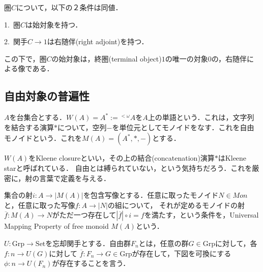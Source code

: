 \documentclass[uplatex, dvipdfmx]{jsreport}
\begin{document}
\begin{proposition}[始対象を持つ圏の特徴付け]\rm{}
    圏$C$について，以下の２条件は同値．
    
    1.\, 圏$C$は始対象を持つ．

    2.\, 関手$C\to 1$は右随伴(right adjoint)を持つ．
\end{proposition}
この下で，圏$C$の始対象は，終圏(terminal object)$1$の唯一の対象$0$の，右随伴による像である．

\subsection{自由対象の普遍性}

\begin{definition}[自由モノイド]\label{def-free_monoid}
    $A$を台集合とする．$W(A)=A^*:={}^{<\omega}\!A$を$A$上の単語という．これは，文字列を結合する演算$*$について，空列$-$を単位元としてモノイドをなす．これを自由モノイドという．これを$M(A)=(A^*,*,-)$とする．
\end{definition}
$W(A)$をKleene closureといい，その上の結合(concatenation)演算$*$はKleene starと呼ばれている．
自由とは縛られていない，という気持ちだろう．これを厳密に，射の言葉で定義を与える．

\begin{definition}\rm{}
    集合の射$i:A\to |M(A)|$を包含写像とする．任意に取ったモノイド$N\in Mon$と，任意に取った写像$f:A\to |N|$の組について，
    それが定めるモノイドの射$\overline{f}:M(A)\to N$がただ一つ存在して$|\overline{f}|\circ i=f$を満たす，という条件を，Universal Mapping Property of free monoid $M(A)$という．
    \begin{center}\end{center}
\end{definition}

\begin{definition}[自由群の普遍性]
    $U:\mathrm{Grp}\to\mathrm{Set}$を忘却関手とする．自由群$F_n$とは，任意の群$G\in\mathrm{Grp}$に対して，各$f:n\to U(G)$に対して
    $\overline{f}:F_n\to G\in\mathrm{Grp}$が存在して，下図を可換にする$\phi:n\to U(F_n)$が存在することを言う．
    \begin{center}\end{center}
\end{definition}
\end{document}
